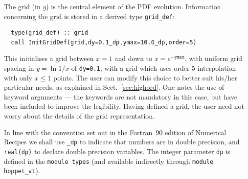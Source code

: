 \documentclass[12pt]{article}
\newcommand{\ttt}[1]{\texttt{#1}}
\begin{document}
The grid (in $y$) is the central element of the PDF evolution.
Information concerning the grid is stored in a derived type
\texttt{grid\_def}:
\begin{lstlisting}
  type(grid_def) :: grid
  call InitGridDef(grid,dy=0.1_dp,ymax=10.0_dp,order=5)
\end{lstlisting}
This initialises a grid between $x=1$ and down to $x =
e^{-\texttt{ymax}}$, with uniform grid spacing in $y = \ln 1/x$ of
\texttt{dy=0.1}, with a grid which  uses order 5 interpolation
with only $x\le 1$ points.
The user can modify this choice to better
suit his/her particular needs, as explained
in Sect.~\ref{sec:highord}.
One notes 
the use of keyword arguments --- the keywords are not
mandatory in this case, but have been included to improve the
legibility. Having defined a grid, 
the user need not worry about the details of
the grid representation.

In line with the convention set out in the Fortran~90 edition of
Numerical Recipes \cite{NRf90} we shall use \texttt{\_dp} to indicate
that numbers are in double precision, and \ttt{real(dp)} to declare
double precision variables. The integer parameter \ttt{dp} is defined
in the \texttt{module types} (and available indirectly through
\ttt{module hoppet\_v1}).
\end{document}
